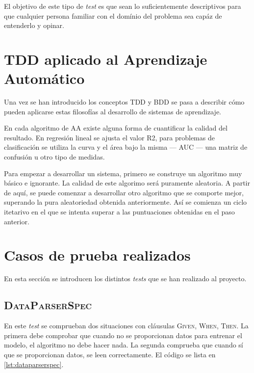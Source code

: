 El objetivo de este tipo de \emph{test} es que sean lo suficientemente
descriptivos para que cualquier persona familiar con el domínio del problema sea
capáz de entenderlo y opinar.

\section{TDD aplicado al Aprendizaje Automático}
\label{sec:tddml}

Una vez se han introducido los conceptos \ac{TDD} y \ac{BDD} se pasa a describir
cómo pueden aplicarse estas filosofías al desarrollo de sistemas de
aprendizaje.

En cada algoritmo de \ac{AA} existe alguna forma de cuantificar la calidad del
resultado. En regresión lineal se ajusta el valor R2, para problemas de
clasificación se utiliza la curva  y el área bajo la misma ---
\ac{AUC} --- una matriz de confusión u otro tipo de medidas.

Para empezar a desarrollar un sistema, primero se construye un algoritmo muy
básico e ignorante. La calidad de este algorimo será puramente aleatoria. A
partir de aquí, se puede comenzar a desarrollar otro algoritmo que se comporte
mejor, superando la pura aleatoriedad obtenida anteriormente. Así se comienza un
ciclo itetarivo en el que se intenta superar a las puntuaciones obtenidas en el
paso anterior.

\section{Casos de prueba realizados}
\label{sec:impltests}

En esta sección se introducen los distintos \emph{tests} que se han realizado al
proyecto.

\subsection{\textsc{DataParserSpec}}
\label{sec:dataparser}

En este \emph{test} se comprueban dos situaciones con cláusulas \textsc{Given,
  When, Then}. La primera debe comprobar que cuando no se proporcionan datos
para entrenar el modelo, el algoritmo no debe hacer nada. La segunda comprueba
que cuando sí que se proporcionan datos, se leen correctamente. El código se
lista en \autoref{lst:dataparserspec}.

